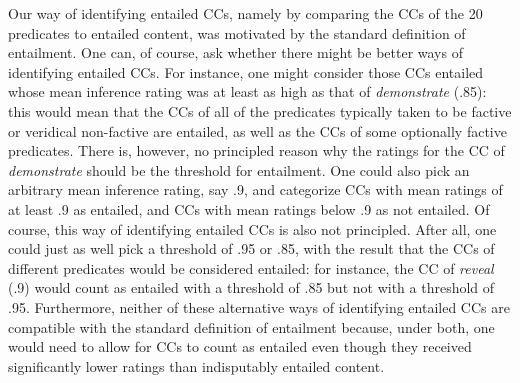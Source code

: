 \documentclass[11pt,fleqn]{article}
\newcommand{\6}{\mbox{$[\hspace*{-.6mm}[$}}
\newcommand{\9}{\mbox{$]\hspace*{-.6mm}]$}}
\begin{document}
Our way of identifying entailed CCs, namely by comparing the CCs of the 20 predicates to entailed content, was motivated by the standard definition of entailment. One can, of course, ask whether there might be better ways of identifying entailed CCs. For instance, one might consider those CCs entailed whose mean inference rating was at least as high as that of {\em demonstrate} (.85): this would mean that the CCs of all of the predicates typically taken to be factive or veridical non-factive are entailed, as well as the CCs of some optionally factive predicates. There is, however, no principled reason why the ratings for the CC of {\em demonstrate} should be the threshold for entailment. One could also pick an arbitrary mean inference rating, say .9, and categorize CCs with mean ratings of at least .9 as entailed, and CCs with mean ratings below .9 as not entailed. Of course, this way of identifying entailed CCs is also not principled. After all, one could just as well pick a threshold of .95 or .85, with the result that the CCs of different predicates would be considered entailed: for instance, the CC of {\em reveal} (.9) would count as entailed with a threshold of .85 but not with a threshold of .95. Furthermore, neither of these alternative ways of identifying entailed CCs are compatible with the standard definition of entailment because, under both, one would need to allow for CCs to count as entailed even though they received significantly lower ratings than indisputably entailed content.

\end{document}
